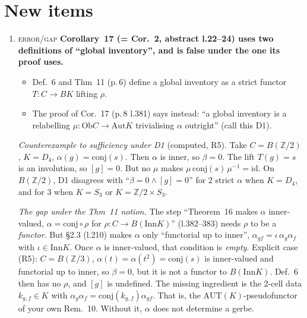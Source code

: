 \documentclass[11pt]{article}
\newcommand{\Z}{\mathbb{Z}}
\newcommand{\Inn}{\mathrm{Inn}}
\newcommand{\Aut}{\mathrm{Aut}}
\newcommand{\iss}[1]{\textsc{#1}}
\newcommand{\vd}[1]{\fbox{\textbf{#1}}}
\begin{document}
\section{New items}
\begin{enumerate}[label=\textbf{N\arabic*},leftmargin=*]
\item \vd{MUST-FIX} \iss{error/gap} \textbf{Corollary~17 (= Cor.~2, abstract l.22--24) uses two
definitions of ``global inventory'', and is false under the one its proof uses.}
\begin{itemize}[leftmargin=1.2em]
\item Def.~6 and Thm~11 (p.\,6) define a global inventory as a strict functor $T:C\to BK$ lifting
$\rho$.
\item The proof of Cor.~17 (p.\,8 l.381) says instead: ``a global inventory is a relabelling
$\mu:\mathrm{Ob}C\to\Aut K$ trivialising $\alpha$ outright'' (call this D1).
\end{itemize}

\emph{Counterexample to sufficiency under D1} (computed, R5). Take $C=B(\Z/2)$, $K=D_4$,
$\alpha(g)=\mathrm{conj}(s)$. Then $\alpha$ is inner, so $\beta=0$. The lift $T(g)=s$ is an
involution, so $[g]=0$. But no $\mu$ makes $\mu\,\mathrm{conj}(s)\,\mu^{-1}=\mathrm{id}$. On
$B(\Z/2)$, D1 disagrees with ``$\beta=0\wedge[g]=0$'' for 2 strict $\alpha$ when $K=D_4$, and for
3 when $K=S_3$ or $K=\Z/2\times S_3$.

\emph{The gap under the Thm~11 notion.} The step ``Theorem~16 makes $\alpha$ inner-valued,
$\alpha=\mathrm{conj}\circ\rho$ for $\rho:C\to B(\Inn K)$'' (l.382--383) needs $\rho$ to be a
\emph{functor}. But §2.3 (l.210) makes $\alpha$ only ``functorial up to inner'',
$\alpha_{gf}=\iota\,\alpha_g\alpha_f$ with $\iota\in\Inn K$. Once $\alpha$ is inner-valued, that
condition is \emph{empty}. Explicit case (R5): $C=B(\Z/3)$, $\alpha(t)=\alpha(t^2)=\mathrm{conj}(s)$
is inner-valued and functorial up to inner, so $\beta=0$, but it is not a functor to $B(\Inn K)$.
Def.~6 then has no $\rho$, and $[g]$ is undefined. The missing ingredient is the 2-cell data
$k_{g,f}\in K$ with $\alpha_g\alpha_f=\mathrm{conj}(k_{g,f})\alpha_{gf}$. That is, the
$\mathrm{AUT}(K)$-pseudofunctor of your own Rem.~10. Without it, $\alpha$ does not determine a gerbe.


\end{enumerate}
\end{document}
